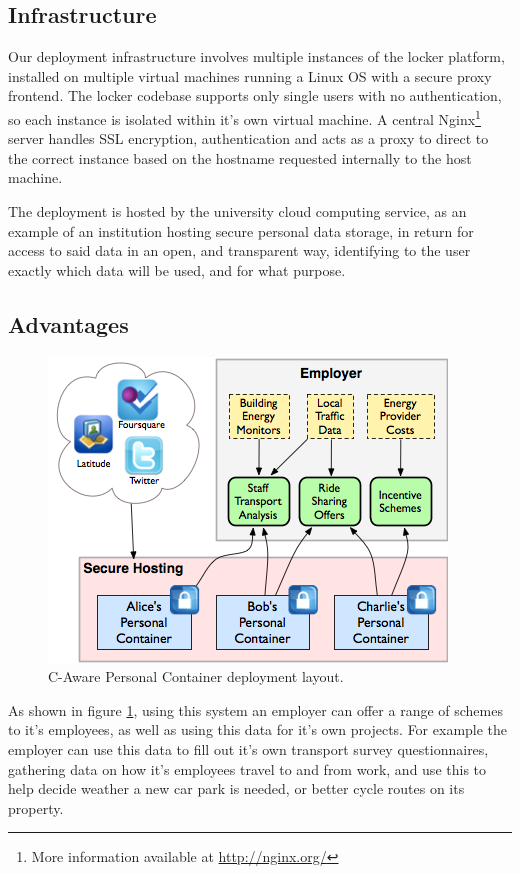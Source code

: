 \documentclass[11pt,a4paper,twoside]{article}
\begin{document}
\newpage
\subsection{Infrastructure}
Our deployment infrastructure involves multiple instances of the locker platform, installed on multiple virtual machines running a Linux OS with a secure proxy frontend. The locker codebase supports only single users with no authentication, so each instance is isolated within it's own virtual machine. A central Nginx\footnote{More information available at \url{http://nginx.org/}} server handles SSL encryption, authentication and acts as a proxy to direct to the correct instance based on the hostname requested internally to the host machine.

The deployment is hosted by the university cloud computing service, as an example of an institution hosting secure personal data storage, in return for access to said data in an open, and transparent way, identifying to the user exactly which data will be used, and for what purpose.


\subsection{Advantages}


\begin{figure}[h]
  \begin{center}
    \includegraphics[scale=0.7]{PersConDataflow.png}
  \end{center}
  \caption{C-Aware Personal Container deployment layout.}
  \label{img-persConDia}
\end{figure}

As shown in figure \ref{img-persConDia}, using this system an employer can offer a range of schemes to it's employees, as well as using this data for it's own projects. For example the employer can use this data to fill out it's own transport survey questionnaires, gathering data on how it's employees travel to and from work, and use this to help decide weather a new car park is needed, or better cycle routes on its property.
\end{document}

